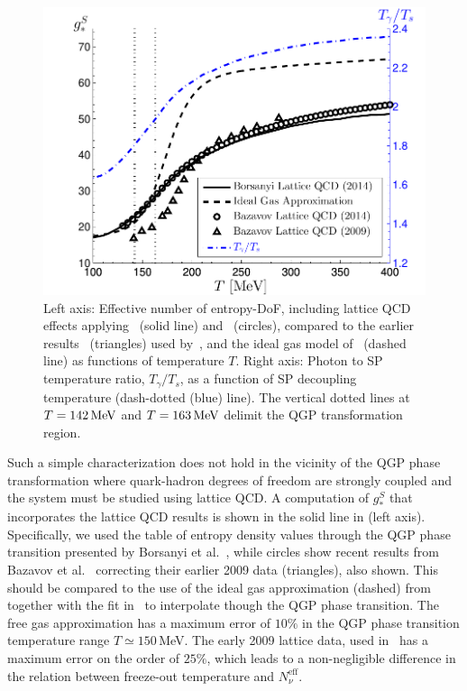 \begin{figure}
\centerline{\includegraphics[width=0.8\linewidth]{plots/gS_T_ratio.pdf}}
\caption{Left axis: Effective number of entropy-DoF, including lattice QCD effects applying~\cite{Borsanyi:2013bia} (solid line) and~\cite{HotQCD:2014kol} (circles), compared to the earlier results~\cite{Bazavov:2009zn} (triangles) used by~\cite{Anchordoqui:2011nh}, and the ideal gas model of~\cite{Coleman:2003hs} (dashed line) as functions of temperature $T$. Right axis: Photon to SP temperature ratio, $T_\gamma/T_s$, as a function of SP decoupling temperature (dash-dotted (blue) line). The vertical dotted lines at $T=142\text{\,MeV}$ and $T=163\text{\,MeV}$ delimit the QGP transformation region. \label{fig:gS}}
 \end{figure}

Such a simple characterization does not hold in the vicinity of the QGP phase transformation where quark-hadron degrees of freedom are strongly coupled and the system must be studied using lattice QCD. A computation of $g_*^S$ that incorporates the lattice QCD results is shown in the solid line in  (left axis). Specifically, we used the table of entropy density values through the QGP phase transition presented by Borsanyi et al.~\cite{Borsanyi:2013bia}, while circles show recent results from Bazavov et al.~\cite{HotQCD:2014kol} correcting their earlier 2009 data\cite{Bazavov:2009zn} (triangles), also shown. This should be compared to the use of the ideal gas approximation (dashed) from~\cite{Coleman:2003hs} together with the fit in~\cite{Wantz:2009it} to interpolate though the QGP phase transition. The free gas approximation has a maximum error of $10\%$ in the QGP phase transition temperature range $T\simeq 150$\,MeV. The early 2009 lattice data, used in~\cite{Anchordoqui:2011nh} has a maximum error on the order of $25\%$, which leads to a non-negligible difference in the relation between freeze-out temperature and $N^{\text{eff}}_{\nu}$. 

